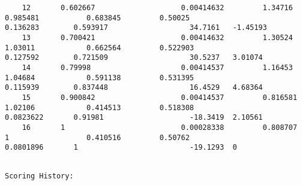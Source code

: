 \documentclass[11pt]{article}
\begin{document}
\begin{verbatim}
    12       0.602667                    0.00414632         1.34716   0.985481           0.683845         0.50025                     0.136283        0.593917                   34.7161   -1.45193
    13       0.700421                    0.00414632         1.30524   1.03011            0.662564         0.522903                    0.127592        0.721509                   30.5237   3.01074
    14       0.79998                     0.00414537         1.16453   1.04684            0.591138         0.531395                    0.115939        0.837448                   16.4529   4.68364
    15       0.900842                    0.00414537         0.816581  1.02106            0.414513         0.518308                    0.0823622       0.91981                    -18.3419  2.10561
    16       1                           0.00028338         0.808707  1                  0.410516         0.50762                     0.0801896       1                          -19.1293  0
    \end{verbatim}

    
    \begin{Verbatim}[commandchars=\\\{\}]

Scoring History: 

    \end{Verbatim}
\end{document}
